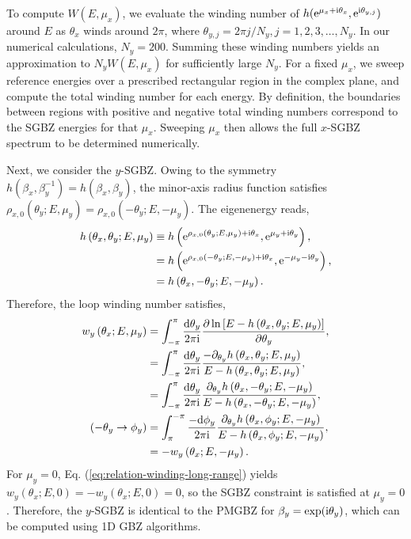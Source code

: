 \documentclass[pdflatex,sn-nature, iicol]{sn-jnl}%
\theoremstyle{thmstyleone}%
\theoremstyle{thmstyletwo}%
\theoremstyle{thmstylethree}%
\begin{document}
To compute $W(E,\mu_{x})$, we evaluate the winding number of $h(\mathrm{e}^{\mu_{x}+\mathrm{i}\theta_{x}},\mathrm{e}^{\mathrm{i}\theta_{y,j}})$
around $E$ as $\theta_{x}$ winds around $2\pi$, where $\theta_{y,j}=2\pi j/N_{y},j=1,2,3,\dots,N_{y}$.
In our numerical calculations, $N_{y}=200$. Summing these winding
numbers yields an approximation to $N_{y}W(E,\mu_{x})$ for sufficiently
large $N_{y}$. For a fixed $\mu_{x}$, we sweep reference energies
over a prescribed rectangular region in the complex plane, and compute
the total winding number for each energy. By definition, the boundaries
between regions with positive and negative total winding numbers correspond
to the SGBZ energies for that $\mu_{x}$. Sweeping $\mu_{x}$ then
allows the full $x$-SGBZ spectrum to be determined numerically.

Next, we consider the $y$-SGBZ. Owing to the symmetry $h(\beta_{x},\beta_{y}^{-1})=h(\beta_{x},\beta_{y})$,
the minor-axis radius function satisfies $\rho_{x,0}(\theta_{y};E,\mu_{y})=\rho_{x,0}(-\theta_{y};E,-\mu_{y})$.
The eigenenergy reads, 
\begin{align}
h\left(\theta_{x},\theta_{y};E,\mu_{y}\right) & \equiv h\left(\mathrm{e}^{\rho_{x,0}(\theta_{y};E,\mu_{y})+\mathrm{i}\theta_{x}},\mathrm{e}^{\mu_{y}+\mathrm{i}\theta_{y}}\right),\nonumber \\
 & =h\left(\mathrm{e}^{\rho_{x,0}(-\theta_{y};E,-\mu_{y})+\mathrm{i}\theta_{x}},\mathrm{e}^{-\mu_{y}-\mathrm{i}\theta_{y}}\right),\nonumber \\
 & =h\left(\theta_{x},-\theta_{y};E,-\mu_{y}\right).
\end{align}
Therefore, the loop winding number satisfies, 
\begin{align}
w_{y}\left(\theta_{x};E,\mu_{y}\right) & =\int_{-\pi}^{\pi}\frac{\mathrm{d}\theta_{y}}{2\pi\mathrm{i}}\frac{\partial\ln\left[E-h\left(\theta_{x},\theta_{y};E,\mu_{y}\right)\right]}{\partial\theta_{y}},\nonumber \\
 & =\int_{-\pi}^{\pi}\frac{\mathrm{d}\theta_{y}}{2\pi\mathrm{i}}\frac{-\partial_{\theta_{y}}h\left(\theta_{x},\theta_{y};E,\mu_{y}\right)}{E-h\left(\theta_{x},\theta_{y};E,\mu_{y}\right)},\nonumber \\
 & =\int_{-\pi}^{\pi}\frac{\mathrm{d}\theta_{y}}{2\pi\mathrm{i}}\frac{\partial_{\theta_{y}}h\left(\theta_{x},-\theta_{y};E,-\mu_{y}\right)}{E-h\left(\theta_{x},-\theta_{y};E,-\mu_{y}\right)},\nonumber \\
(-\theta_{y}\rightarrow\phi_{y}) & =\int_{\pi}^{-\pi}\frac{-\mathrm{d}\phi_{y}}{2\pi\mathrm{i}}\frac{\partial_{\theta_{y}}h\left(\theta_{x},\phi_{y};E,-\mu_{y}\right)}{E-h\left(\theta_{x},\phi_{y};E,-\mu_{y}\right)},\nonumber \\
 & =-w_{y}\left(\theta_{x};E,-\mu_{y}\right).\label{eq:relation-winding-long-range}
\end{align}
For $\mu_{y}=0$, Eq. (\ref{eq:relation-winding-long-range}) yields $w_{y}(\theta_{x};E,0)=-w_{y}(\theta_{x};E,0)=0$,
so the SGBZ constraint is satisfied at $\mu_{y}=0$. Therefore, the
$y$-SGBZ is identical to the PMGBZ for $\beta_{y}=\exp(\mathrm{i}\theta_{y})$,
which can be computed using 1D GBZ algorithms.
\end{document}
